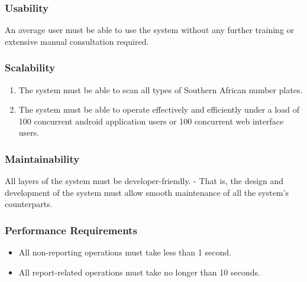 \documentclass[12pt]{article}
\begin{document}
	                  	\vspace{0.1in}
	                  	\subsubsection{Usability}
	                  	An average user must be able to use the system without any further training or extensive manual consultation required.
	                  	
	                  	\vspace{0.1in}
	                  	\subsubsection{Scalability}
	                  	\begin{enumerate}
		                  	\item The system must be able to scan all types of Southern African number plates.
		                  	\item The system must be able to operate effectively and efficiently under a load of 100 concurrent android application users or 100 concurrent web interface users.
	                  	\end{enumerate}
	                  	
	                  	\vspace{0.1in}
	                  	\subsubsection{Maintainability}
	                  	All layers of the system must be developer-friendly. - That is, the design and development of the system must allow smooth maintenance of all the system's counterparts.
	                  	
	                  	\vspace{0.1in}
	                  	\subsubsection{Performance Requirements}
	                  	\begin{itemize}
	                  		\item All non-reporting operations must take less than 1 second.
	                  		\item All report-related operations must take no longer than 10 seconds.
	                  	\end{itemize}
	                  	
\end{document}
